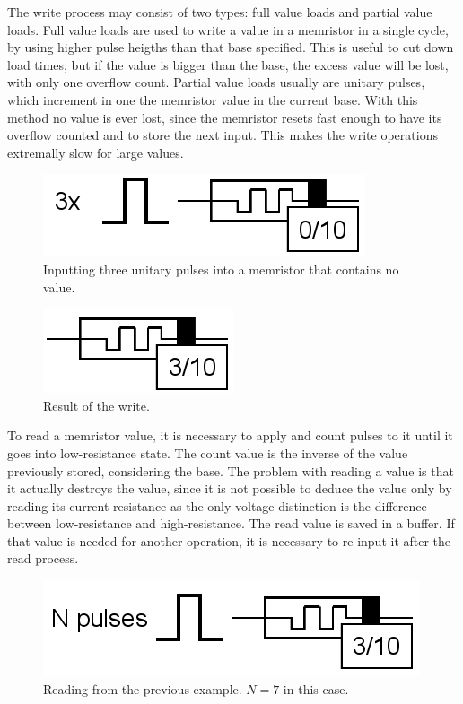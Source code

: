 \documentclass[ecp,tc,english]{iiufrgs}
\begin{document}
The write process may consist of two types: full value loads and partial value loads. Full value loads are used to write a value in a memristor in a single cycle, by using higher pulse heigths than that base specified. This is useful to cut down load times, but if the value is bigger than the base, the excess value will be lost, with only one overflow count. Partial value loads usually are unitary pulses, which increment in one the memristor value in the current base. With this method no value is ever lost, since the memristor resets fast enough to have its overflow counted and to store the next input. This makes the write operations extremally slow for large values.

\begin{figure}
  \caption{Inputting three unitary pulses into a memristor that contains no value.}
  \centerline{\includegraphics{fig/memristor-basicwrite.png}}
  \label{fig:mr_basicwrite}
\end{figure}

\begin{figure}
  \caption{Result of the write.}
  \centerline{\includegraphics{fig/memristor-basicwriteresult.png}}
  \label{fig:mr_basicwriteres}
\end{figure}

To read a memristor value, it is necessary to apply and count pulses to it until it goes into low-resistance state. The count value is the inverse of the value previously stored, considering the base. The problem with reading a value is that it actually destroys the value, since it is not possible to deduce the value only by reading its current resistance as the only voltage distinction is the difference between low-resistance and high-resistance. The read value is saved in a buffer. If that value is needed for another operation, it is necessary to re-input it after the read process.

\begin{figure}
  \caption{Reading from the previous example. $ N=7 $ in this case.}
  \centerline{\includegraphics{fig/memristor-basicread.png}}
  \label{fig:mr_basicread}
\end{figure}
\end{document}
